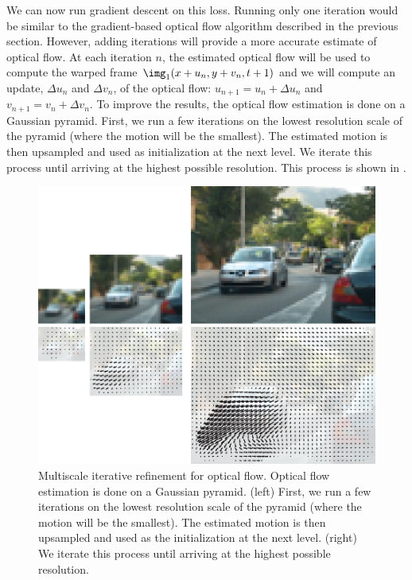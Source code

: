 We can now run gradient descent on this loss. Running only one iteration would be similar to the gradient-based optical flow algorithm described in the previous section. However, adding iterations will provide a more accurate estimate of optical flow. At each iteration $n$, the estimated optical flow will be used to compute the warped frame $\img_1 (x+u_n,y+v_n,t+1)$ and we will compute an update, $\Delta u_n$ and $\Delta v_n$, of the optical flow: $u_{n+1} = u_n+\Delta u_n$ and $v_{n+1}= v_n + \Delta v_n$. To improve the results, the optical flow estimation is done on a Gaussian pyramid. First, we run a few iterations on the lowest resolution scale of the pyramid (where the motion will be the smallest). The estimated motion is then upsampled and used as initialization at the next level. We iterate this process until arriving at the highest possible resolution. This process is shown in \fig{\ref{fig:multiscale_iterative_optical_flow}}.


\begin{figure}[t]
\centerline{
\includegraphics[width=1\linewidth]{figures/optical_flow/multiscale_iterative_optical_flow.eps}}
\caption{Multiscale iterative refinement for optical flow. Optical flow estimation is done on a Gaussian pyramid. (left) First, we run a few iterations on the lowest resolution scale of the pyramid (where the motion will be the smallest). The estimated motion is then upsampled and used as the initialization at the next level. (right) We iterate this process until arriving at the highest possible resolution.}
\label{fig:multiscale_iterative_optical_flow}
\end{figure}

